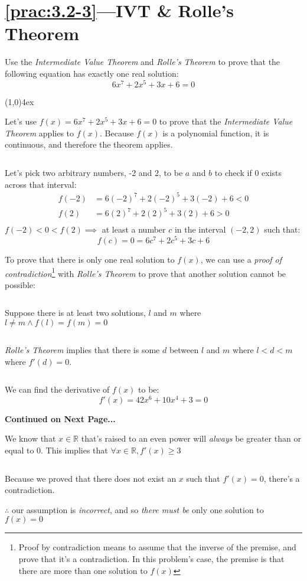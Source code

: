 \documentclass{MathNotes}
\newcommand{\br}{
	\begin{center}
		\line(1,0){4ex}
	\end{center}}
\newcommand{\continued}{
	\mbox{}
	\vfill
	\textbf{Continued on Next Page...}\newpage
}
\newcommand{\bl}{
	\newline$ $\newline
}
\begin{document}
\section*{\ref{prac:3.2-3}---IVT \& Rolle's Theorem}\label{ans:3.2-3}
Use the \textit{Intermediate Value Theorem} and \textit{Rolle's Theorem} to
prove that the following equation has exactly one real solution:
$$6x^7+2x^5+3x+6=0$$
\br
Let's use $f(x)=6x^7+2x^5+3x+6=0$ to prove that the \textit{Intermediate
	Value Theorem} applies to $f(x)$. Because $f(x)$ is a polynomial function, it
is continuous, and therefore the theorem applies.
\bl
Let's pick two arbitrary numbers, -2 and 2, to be $a$ and $b$ to check if $0$ exists
across that interval:
\begin{align*}
	f(-2) & =6(-2)^7+2(-2)^5+3(-2)+6 < 0 \\
	f(2)  & =6(2)^7+2(2)^5+3(2)+6 > 0    \\
\end{align*}
$f(-2)<0<f(2)\implies$ at least a number $c$ in the interval $(-2, 2)$ such
that: $$f(c)=0=6c^7+2c^5+3c+6$$

To prove that there is only one real solution to $f(x)$, we can use a
\textit{proof of contradiction}\footnote{Proof by contradiction means to assume
	that the inverse of the premise, and prove that it's a contradiction. In this
	problem's case, the premise is that there are more than one solution to $f(x)$}
with \textit{Rolle's Theorem} to prove that
another solution cannot be possible:
\bl
{}
Suppose there is at least two solutions, $l$ and $m$ where
$l\neq m\land f(l)=f(m)=0$
\bl
\textit{Rolle's Theorem} implies that there is some $d$ between $l$ and $m$
where $l<d<m$ where $f'(d)=0$.
\bl
We can find the derivative of $f(x)$ to be:
$$f'(x)=42x^6+10x^4+3=0$$

\continued
{}
We know that $x\in\mathbb{R}$ that's raised to an even power will
\textit{always} be greater than or equal to 0. This implies that
$\forall x\in\mathbb{R},f'(x)\geq3$
\bl
Because we proved that there does not exist an $x$ such that $f'(x)=0$, there's
a contradiction.

$\therefore$ our assumption is \textit{incorrect}, and so \textit{there must be}
only one solution to $f(x)=0$
\end{document}
